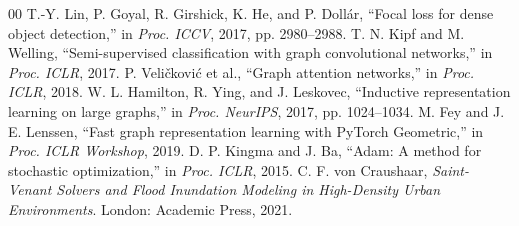 \documentclass[conference]{IEEEtran}
\begin{document}
\begin{thebibliography}{00}
 T.-Y. Lin, P. Goyal, R. Girshick, K. He, and P. Dollár, ``Focal loss for dense object detection,'' in \textit{Proc. ICCV}, 2017, pp. 2980--2988.
 T. N. Kipf and M. Welling, ``Semi-supervised classification with graph convolutional networks,'' in \textit{Proc. ICLR}, 2017.
 P. Veličković et al., ``Graph attention networks,'' in \textit{Proc. ICLR}, 2018.
 W. L. Hamilton, R. Ying, and J. Leskovec, ``Inductive representation learning on large graphs,'' in \textit{Proc. NeurIPS}, 2017, pp. 1024--1034.
 M. Fey and J. E. Lenssen, ``Fast graph representation learning with PyTorch Geometric,'' in \textit{Proc. ICLR Workshop}, 2019.
 D. P. Kingma and J. Ba, ``Adam: A method for stochastic optimization,'' in \textit{Proc. ICLR}, 2015.
 C. F. von Craushaar, \textit{Saint-Venant Solvers and Flood Inundation Modeling in High-Density Urban Environments}. London: Academic Press, 2021.
\end{thebibliography}
\end{document}
